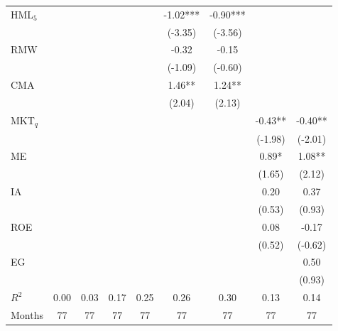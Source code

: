 \begin{table}[!htbp]
\begin{tabular*}{\linewidth}{@{\extracolsep{\fill}}lcccccccc}
HML$_5$ &  &  &  &  & -1.02*** & -0.90*** &  &  \\
 &  &  &  &  & (-3.35) & (-3.56) &  &  \\
RMW &  &  &  &  & -0.32 & -0.15 &  &  \\
 &  &  &  &  & (-1.09) & (-0.60) &  &  \\
CMA &  &  &  &  & 1.46** & 1.24** &  &  \\
 &  &  &  &  & (2.04) & (2.13) &  &  \\
MKT$_q$ &  &  &  &  &  &  & -0.43** & -0.40** \\
 &  &  &  &  &  &  & (-1.98) & (-2.01) \\
ME &  &  &  &  &  &  & 0.89* & 1.08** \\
 &  &  &  &  &  &  & (1.65) & (2.12) \\
IA &  &  &  &  &  &  & 0.20 & 0.37 \\
 &  &  &  &  &  &  & (0.53) & (0.93) \\
ROE &  &  &  &  &  &  & 0.08 & -0.17 \\
 &  &  &  &  &  &  & (0.52) & (-0.62) \\
EG &  &  &  &  &  &  &  & 0.50 \\
 &  &  &  &  &  &  &  & (0.93) \\
$R^2$ & 0.00 & 0.03 & 0.17 & 0.25 & 0.26 & 0.30 & 0.13 & 0.14 \\
Months & 77 & 77 & 77 & 77 & 77 & 77 & 77 & 77 \\
\bottomrule
\end{tabular*}

\end{table}
